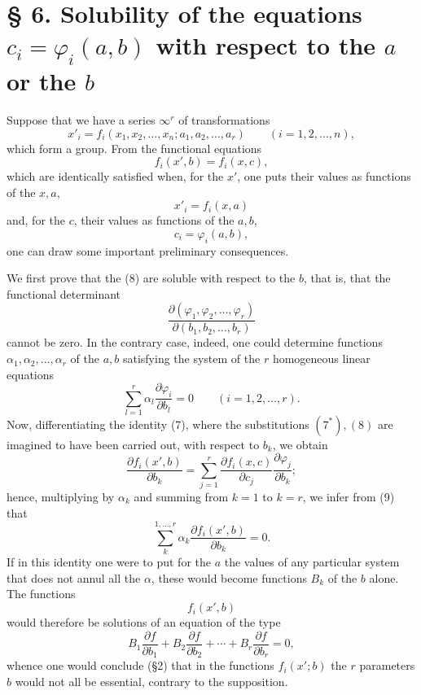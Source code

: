 \documentclass[11pt]{book}
\begin{document}
\section*{\S{} 6. Solubility of the equations $c_i=\varphi_i(a,b)$ with respect to the $a$ or the $b$}

Suppose that we have a series $\infty^r$ of transformations
\begin{equation*}\tag{6}
 x'_i=f_i(x_1,x_2,\ldots,x_n;a_1,a_2,\ldots,a_r)\qquad (i=1,2,\ldots,n),
\end{equation*}
which form a group. From the functional equations
\begin{equation*}\tag{7}
 f_i(x',b)=f_i(x,c),
\end{equation*}
which are identically satisfied when, for the $x'$, one puts their values as functions of the $x,a$,
\begin{equation*}\tag{$7^*$}
 x'_i=f_i(x,a)
\end{equation*}
and, for the $c$, their values as functions of the $a,b$,
\begin{equation*}\tag{8}
 c_i=\varphi_i(a,b),
\end{equation*}
one can draw some important preliminary consequences.

We first prove that the (8) are soluble with respect to the $b$, that is, that the functional determinant
\[
 \frac{\partial(\varphi_1,\varphi_2,\ldots,\varphi_r)}{\partial(b_1,b_2,\ldots,b_r)}
\]
cannot be zero. In the contrary case, indeed, one could determine functions $\alpha_1,\alpha_2,\ldots,\alpha_r$ of the $a,b$ satisfying the system of the $r$ homogeneous linear equations
\begin{equation*}\tag{9}
 \sum\limits_{l=1}^r \alpha_l\frac{\partial \varphi_i}{\partial b_l}=0\qquad (i=1,2,\ldots,r).
\end{equation*}
Now, differentiating the identity (7), where the substitutions $(7^*),(8)$ are imagined to have been carried out, with respect to $b_k$, we obtain
\[
 \frac{\partial f_i(x',b)}{\partial b_k}
 =\sum\limits_{j=1}^r\frac{\partial f_i(x,c)}{\partial c_j}\frac{\partial\varphi_j}{\partial b_k};
\]
hence, multiplying by $\alpha_k$ and summing from $k=1$ to $k=r$, we infer from (9) that
\[
 \sum\limits_k^{1,\ldots,r} \alpha_k\frac{\partial f_i(x',b)}{\partial b_k}=0.
\]
If in this identity one were to put for the $a$ the values of any particular system that does not annul all the $\alpha$, these would become functions $B_k$ of the $b$ alone. The functions
\[
 f_i(x',b)
\]
would therefore be solutions of an equation of the type
\[
 B_1\frac{\partial f}{\partial b_1}+B_2\frac{\partial f}{\partial b_2}+\cdots+B_r\frac{\partial f}{\partial b_r}=0,
\]
whence one would conclude (\S{}2) that in the functions $f_i(x';b)$ the $r$ parameters $b$ would not all be essential, contrary to the supposition.
\end{document}
